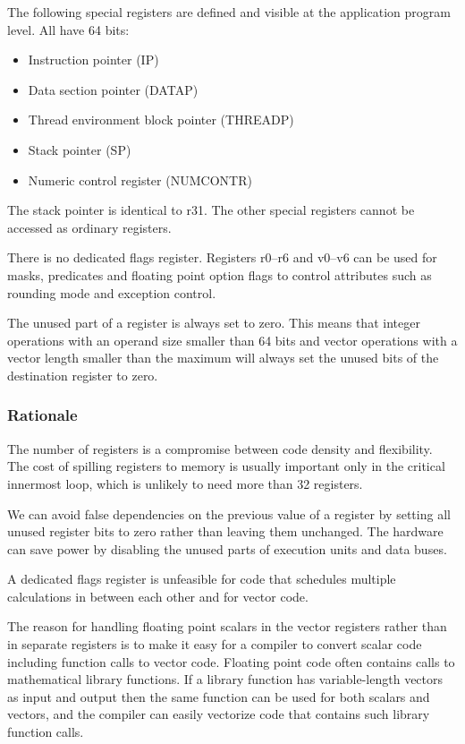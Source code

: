 \documentclass[forwardcom.tex]{subfiles}
\begin{document}
The following special registers are defined and visible at the application program level. All have 64 bits:

\begin{itemize}
\item Instruction pointer (IP)
\item Data section pointer (DATAP)
\item Thread environment block pointer (THREADP)
\item Stack pointer (SP)
\item Numeric control register (NUMCONTR)
\end{itemize}

The stack pointer is identical to r31. The other special registers cannot be accessed as ordinary registers.
\vspace{2mm}

There is no dedicated flags register. Registers r0--r6 and v0--v6 can be used for masks, predicates and floating point option flags to control attributes such as rounding mode and exception control.
\vspace{2mm}

The unused part of a register is always set to zero. This means that integer operations with an operand size smaller than 64 bits and vector operations with a vector length smaller than the maximum will always set the unused bits of the destination register to zero.

\subsubsection{Rationale}
The number of registers is a compromise between code density and flexibility. The cost of spilling registers to memory is usually important only in the critical innermost loop, which is unlikely to need more than 32 registers.
\vspace{2mm}

We can avoid false dependencies on the previous value of a register by setting all unused register bits to zero rather than leaving them unchanged. The hardware can save power by disabling the unused parts of execution units and data buses.
\vspace{2mm}

A dedicated flags register is unfeasible for code that schedules multiple calculations in between each other and for vector code.
\vspace{2mm}

The reason for handling floating point scalars in the vector registers rather than in separate registers is to make it easy for a compiler to convert scalar code including function calls to vector code. Floating point code often contains calls to mathematical library functions. If a library function has variable-length vectors as input and output then the same function can be used for both scalars and vectors, and the compiler can easily vectorize code that contains such library function calls.
\end{document}
